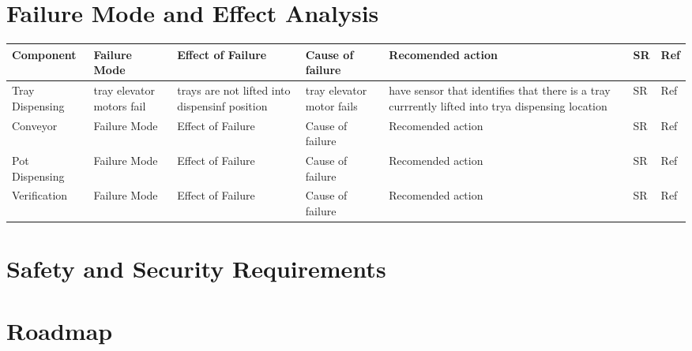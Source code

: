 \documentclass{article}
\begin{document}
\section{Failure Mode and Effect Analysis}

\begin{center}
    \begin{tabular}{ | l |  l  l  l  l  l  l |}
    \hline
    Component & Failure Mode & Effect of Failure & Cause of failure & Recomended action & SR & Ref\\
    \hline
    Tray Dispensing & tray elevator motors fail & trays are not lifted into dispensinf position & tray elevator motor fails & have sensor that identifies that there is a tray currrently lifted into trya dispensing location & SR & Ref\\
    \hline
    Conveyor & Failure Mode & Effect of Failure & Cause of failure & Recomended action & SR & Ref\\
    \hline
    Pot Dispensing & Failure Mode & Effect of Failure & Cause of failure & Recomended action & SR & Ref\\
    \hline
    Verification & Failure Mode & Effect of Failure & Cause of failure & Recomended action & SR & Ref\\
    \hline
    \end{tabular}
\end{center}


\section{Safety and Security Requirements}


\section{Roadmap}

\end{document}
